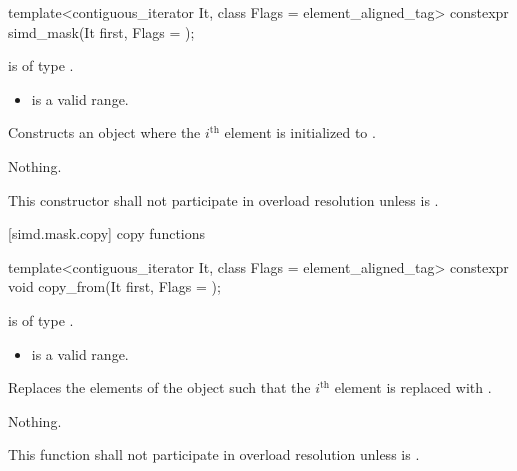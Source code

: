 \begin{itemdecl}
template<contiguous_iterator It, class Flags = element_aligned_tag>
  constexpr simd_mask(It first, Flags = {});
\end{itemdecl}

\begin{itemdescr}
  \pnum\constraints
   is of type .

  \pnum\requires
  \begin{itemize}
    \item \tcode{[mem, mem + size())} is a valid range.
  \end{itemize}

  \pnum\effects
  Constructs an object where the $i^\text{th}$ element is initialized to  \foralli.

  \pnum\throws Nothing.

  \pnum\remarks
  This constructor shall not participate in overload resolution unless  is .

\end{itemdescr}

[simd.mask.copy]{\texorpdfstring{ copy}{simd_mask copy} functions}

\begin{itemdecl}
template<contiguous_iterator It, class Flags = element_aligned_tag>
  constexpr void copy_from(It first, Flags = {});
\end{itemdecl}

\begin{itemdescr}
  \pnum\constraints
   is of type .

  \pnum\requires
  \begin{itemize}
    \item \tcode{[mem, mem + size())} is a valid range.
  \end{itemize}

  \pnum\effects
  Replaces the elements of the  object such that the $i^\text{th}$ element is replaced with  \foralli.

  \pnum\throws Nothing.

  \pnum\remarks
  This function shall not participate in overload resolution unless  is .

\end{itemdescr}

